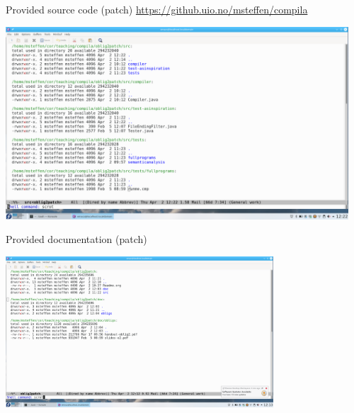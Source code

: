 \documentclass{beamer}
\begin{document}
\begin{frame}[label={sec:orgf04b676}]{Provided source code (patch)}
\url{https://github.uio.no/msteffen/compila}

\includegraphics[width=0.96\textwidth]{figures/snaps/directorystructure-src}
\end{frame}



\begin{frame}[label={sec:org72d0078}]{Provided documentation (patch)}

\begin{center}
 \includegraphics[width=0.75\textwidth]{figures/snaps/directorystructure-doc}
\end{center}
\end{frame}
\end{document}

